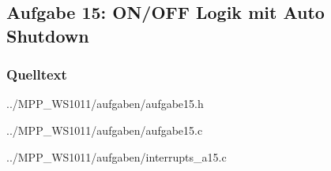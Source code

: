 \subsection*{Aufgabe 15: ON/OFF Logik mit Auto Shutdown}

\subsubsection*{Quelltext}


{../MPP_WS1011/aufgaben/aufgabe15.h}


{../MPP_WS1011/aufgaben/aufgabe15.c}


{../MPP_WS1011/aufgaben/interrupts_a15.c}
